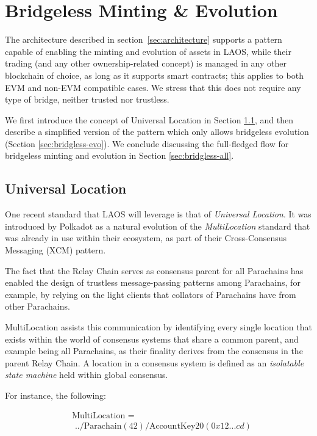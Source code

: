 \section{Bridgeless Minting \& Evolution}\label{sec:bridgeless-tech}

The architecture described in section \ref{sec:architecture} supports 
a pattern capable of enabling the minting and evolution
of assets in LAOS, while their trading (and any other ownership-related
concept) is managed in any other blockchain of choice, as 
long as it supports smart contracts; this applies to both EVM and
non-EVM compatible cases. We stress that this does not require any
type of bridge, neither trusted nor trustless.

We first introduce the concept of
Universal Location in Section \ref{sec:universal-location},
and then describe a simplified version of the pattern which 
only allows bridgeless evolution (Section \ref{sec:bridgless-evo}).
We conclude discussing the full-fledged flow for bridgeless minting and evolution
in Section \ref{sec:bridgless-all}.

\subsection{Universal Location}\label{sec:universal-location}

One recent standard that LAOS will leverage is that of {\it Universal
Location}. It was introduced by Polkadot as a natural evolution
of the {\it MultiLocation} standard that was already in use within their
ecosystem, as part of their Cross-Consensus Messaging (XCM)
pattern\cite{multilocation}.

The fact that the Relay Chain serves as consensus parent for all
Parachains has enabled the design of trustless message-passing patterns
among Parachains, for example, by relying on the light clients
that collators of Parachains have from other Parachains.

MultiLocation assists this communication by identifying
every single location that exists within the world of consensus
systems that share a common parent, and example being all Parachains,
as their finality derives from the consensus in the parent Relay Chain.
A location in a consensus system is defined as an
{\it isolatable state machine} held within global consensus.

For instance, the following:

\begin{align}
    & \text{MultiLocation =}  \label{eq:multilocation1} \\
    & \,\, ../\text{Parachain}(42)/\text{AccountKey20}(0x12...cd) \nonumber
\end{align}

